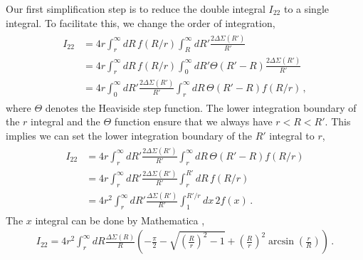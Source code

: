 \documentclass[a4paper,11pt]{article}
\begin{document}
Our first simplification step is to reduce the double integral $I_{22}$ to a single integral.
To facilitate this, we change the order of integration,
\begin{align}
\begin{split}
 I_{22}
 &= 4 r \int_r^{\infty} dR\, f(R/r) \int_R^\infty dR' \frac{2 \Delta \Sigma(R')}{R'} \\
 &= 4 r \int_r^{\infty} dR\, f(R/r) \int_0^\infty dR' \Theta(R' - R) \frac{2 \Delta \Sigma(R')}{R'} \\
 &= 4 r \int_0^\infty dR' \frac{2 \Delta \Sigma(R')}{R'} \int_r^\infty dR \, \Theta(R' - R) f(R/r) \,,
\end{split}
\end{align}
where $\Theta$ denotes the Heaviside step function.
The lower integration boundary of the $r$ integral and the $\Theta$ function ensure that we always have $r < R < R'$.
This implies we can set the lower integration boundary of the $R'$ integral to $r$,
\begin{align}
\begin{split}
 I_{22}
 &= 4 r \int_r^\infty dR' \frac{2 \Delta \Sigma(R')}{R'} \int_r^\infty dR \, \Theta(R' - R) f(R/r) \\
 &= 4 r \int_r^\infty dR' \frac{2 \Delta \Sigma(R')}{R'} \int_r^{R'} dR \, f(R/r) \\
 &= 4 r^2 \int_r^\infty dR' \frac{\Delta \Sigma(R')}{R'} \int_1^{R'/r} dx \, 2f(x) \,.
\end{split}
\end{align}
The $x$ integral can be done by Mathematica \citep{Mathematica13},
\begin{align}
 I_{22} = 4 r^2 \int_r^\infty dR \frac{\Delta \Sigma(R)}{R} \left(
   -\frac{\pi}{2}
   -\sqrt{\left(\frac{R}{r}\right)^2-1}
   +\left(\frac{R}{r}\right)^2 \arcsin\left(\frac{r}{R}\right)
  \right) \,.
\end{align}
\end{document}

